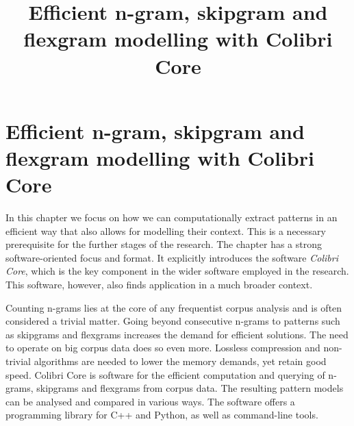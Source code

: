 







\title{Efficient n-gram, skipgram and flexgram modelling with Colibri Core}

\chapter{Efficient n-gram, skipgram and flexgram modelling with Colibri Core}
\label{chap:coco}

In this chapter we focus on how we can computationally extract patterns in an efficient
way that also allows for modelling their context. This is a necessary
prerequisite for the further stages of the research.  The chapter has a strong
software-oriented focus and format. It explicitly introduces the software \emph{Colibri
Core}, which is the key component in the wider software employed in the research. This
software, however, also finds application in a much broader context.

Counting n-grams lies at the core of any frequentist corpus analysis and is
often considered a trivial matter. Going beyond consecutive n-grams to patterns
such as skipgrams and flexgrams increases the demand for efficient solutions.
The need to operate on big corpus data does so even more.  Lossless compression
and non-trivial algorithms are needed to lower the memory demands, yet retain
good speed. Colibri Core is software for the efficient computation and querying
of n-grams, skipgrams and flexgrams from corpus data. The resulting pattern
models can be analysed and compared in various ways. The software offers a
programming library for C++ and Python, as well as command-line tools.

